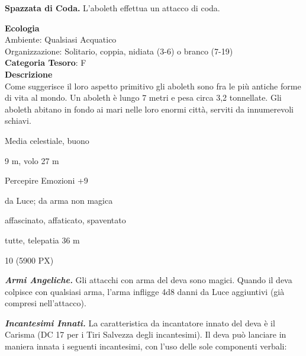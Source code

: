 \begin{multicols}{2}
{\textbf{Spazzata di Coda.} L'aboleth effettua un attacco di coda.

\textbf{Ecologia}\\
Ambiente: Qualsiasi Acquatico\\
Organizzazione: Solitario, coppia, nidiata (3-6) o branco (7-19)\\
\textbf{Categoria Tesoro}: F\\
\textbf{Descrizione}\\
Come suggerisce il loro aspetto primitivo gli aboleth sono fra le più antiche forme di vita al mondo. Un aboleth è lungo 7 metri e pesa circa 3,2 tonnellate. Gli aboleth abitano in fondo ai mari nelle loro enormi città, serviti da innumerevoli schiavi.

\begin{description}[noitemsep, topsep=0pt, parsep=0pt, partopsep=0pt, itemsep=1pt, leftmargin=2.35cm,  labelwidth=2.2cm, itemindent=0cm, listparindent=0pt] %
\setlength{\baselineskip}{10pt}
\item[\textbf{Taglia/Tipo}] Media celestiale, buono
\item[\textbf{Caratt.}] 
\item[\textbf{Punti Ferita}] 
\item[\textbf{Movimento}] 9 m, volo 27 m
\item[\textbf{Tiri Salvez.}] 
\item[\textbf{Comp.}] Percepire Emozioni +9
\item[\textbf{Res. Danni}] da Luce; da arma non magica
\item[\textbf{Immunità}] affascinato, affaticato, spaventato
\item[\textbf{Sensi}] 
\item[\textbf{Linguaggi}] tutte, telepatia 36 m
\item[\textbf{Sfida}] 10 (5900 PX)
\end{description}
\smallskip

\emph{\textbf{Armi Angeliche.}} Gli attacchi con arma del deva sono magici. Quando il deva colpisce con qualsiasi arma, l'arma infligge 4d8 danni da Luce aggiuntivi (già compresi nell'attacco).

\emph{\textbf{Incantesimi Innati.}} La caratteristica da incantatore innato del deva è il Carisma (DC 17 per i Tiri Salvezza degli incantesimi). Il deva può lanciare in maniera innata i seguenti incantesimi, con l'uso delle sole componenti verbali:

}
\end{multicols}
